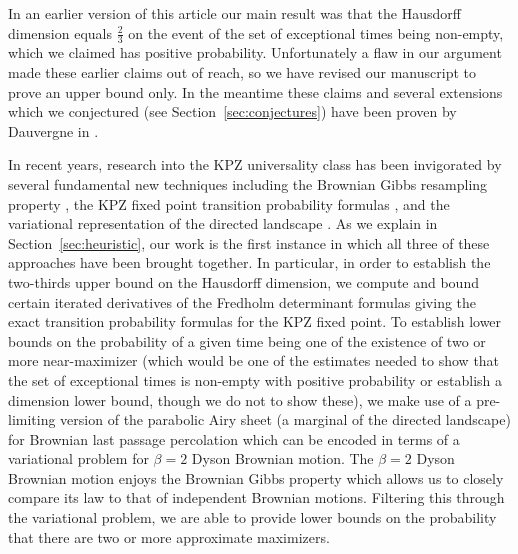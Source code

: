 \documentclass[oneside,final,11pt]{amsart}
\theoremstyle{definition}
\newcommand{\1}[1]{\mathbf{1}_{#1}}
\newcommand{\kmtext}[1]{{\color{red}[KM:#1]}}
\numberwithin{equation}{section}
\begin{document}
In an earlier version of this article our main result was that the Hausdorff dimension equals $\frac{2}{3}$ on the event of the set of exceptional times being non-empty, which we claimed has positive probability. Unfortunately a flaw in our argument made these earlier claims out of reach, so we have revised our manuscript to prove an upper bound only. In the meantime these claims and several extensions which we conjectured (see Section~\ref{sec:conjectures}) have been proven by Dauvergne in \cite{dauvergne2022non}.

In recent years, research into the KPZ universality class has been invigorated by several fundamental new techniques including the Brownian Gibbs resampling property \cite{BrownianGibbs}, the KPZ fixed point transition probability formulas \cite{fixedpt}, and the variational representation of the directed landscape \cite{Landscape}. As we explain in Section~\ref{sec:heuristic}, our work is the first instance in which all three of these approaches have been brought together. In particular, in order to establish the two-thirds upper bound on the Hausdorff dimension, we compute and bound certain iterated derivatives of the Fredholm determinant formulas giving the exact transition probability formulas for the KPZ fixed point. To establish lower bounds on the probability of a given time being one of the existence of two or more near-maximizer (which would be one of the estimates needed to show that the set of exceptional times is non-empty with positive probability or establish a dimension lower bound, though we do not to show these),
 we make use of a pre-limiting version of the parabolic Airy sheet (a marginal of the directed landscape) for Brownian last passage percolation which can be encoded in terms of a variational problem for $\beta=2$ Dyson Brownian motion. The $\beta=2$ Dyson Brownian motion enjoys the Brownian Gibbs property which allows us to closely compare its law to that of independent Brownian motions. Filtering this through the variational problem, we are able to provide lower bounds on the probability that there are two or more approximate maximizers.
\end{document}
